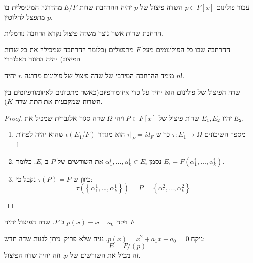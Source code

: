 \documentclass{tstextbook}
\begin{document}
\begin{definition}
עבור פולינום \(p \in F[x]\) השדה פיצול של \(p\) יהיה ההרחבת שדות \(E / F\) מהדרגה המינימלית בו \(p\) מתפצל לחלוטין.

\end{definition}
\begin{definition}
הרחבת שדות אשר נוצר משדה פיצול נקרא הרחבה נורמלית.

\end{definition}
\begin{proposition}
ההרחבה שבו כל הפולינומים מעל \(F\) מתפצלים (כלומר ההרחבה שמכילה את כל שדות הפיצול) יהיה הסוגר האלגברי.

\end{proposition}
\begin{proposition}
מימד ההרחבה המירבי של שדה פיצול של פולינום מדרגה \(n\) יהיה \(n!\).

\end{proposition}
\begin{theorem}
שדה הפיצול של פולינום הוא יחיד על כדי איזומורפיזם(כאשר מתכוונים לאיזומורפיזמים בין השדות שמקבעות את התת שדה \(K\)).

\end{theorem}
\begin{proof}
יהיו \(E_{1},E_{2}\) שדות פיצול של \(P \in F[x]\) ויהי \(\Omega\) שדה סגור אלגברית שמכיל את \(E_{2}\).

  \begin{enumerate}
    \item מספר השיכונים \(\tau:E_{1}\to \Omega\) כך ש-\(\tau|_{F}=id_{F}\) הוא מוגדר \(\iota(E_{1} / F)\) שהוא יהיה לפחות 1 


    \item נסמן \(\alpha_{1}^{i},\dots,\alpha_{k}^{i} \in E_{i}\) את השורשים של \(P\) ב-\(E_{i}\). כלומר \(E_{i}=F\left( \alpha_{1}^{i},\dots,\alpha_{k}^{i} \right)\). 


    \item כיוון ש-\(\tau(P)=P\) נקבל כי: 
$$\tau\left( \left\{  \alpha_{1}^{1},\dots,\alpha_{k}^{1}  \right\} \right)=P= \left\{  \alpha_{1}^{2},\dots,\alpha_{k}^{2}  \right\}$$


  \end{enumerate}
\end{proof}
\begin{example}
ניקח \(p(x)=x-a_{0}\) ב-\(F\). שדה הפיצול יהיה \(F\)

\end{example}
\begin{example}
ניקח \(p(x)=x^2+a_{1}x+a_{0}=0\). נניח שלא פריק. ניתן לבנות שדה חדש:
$$E =  F / (p)$$
זה מכיל את השורשים של \(p\). וזה יהיה שדה הפיצול.

\end{example}
\end{document}
